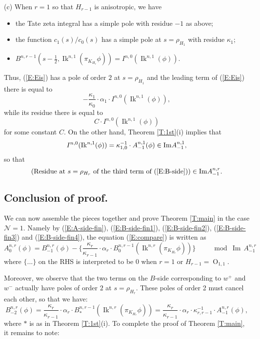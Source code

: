 \documentclass[10pt]{amsart}
\theoremstyle{plain}
\numberwithin{equation}{section}
\begin{document}
\noindent (c) When $r=1$ so that $H_{r-1}$ is anisotropic, we have
\vskip 5pt
\begin{itemize}
\item the Tate zeta integral has a simple pole with residue $-1$  as above;
\item the function $c_1(s)/c_0(s)$ has a simple pole at $s = \rho_{H_1}$ with residue $\kappa_1$;
\item $B^{n, r-1}(s -\frac{1}{2}, {\operatorname{Ik}}^{n,1}(\pi_{K_{H_r}} \phi))= I^{n,0}({\operatorname{Ik}}^{n,1}(\phi))$.
\end{itemize}
Thus, (\ref{E:Eis}) has a pole of order $2$ at $s = \rho_{H_1}$ and the leading term of (\ref{E:Eis}) there is equal to 
\[  - \frac{\kappa_1}{\kappa_0} \cdot \alpha_1 \cdot  I^{n,0}({\operatorname{Ik}}^{n,1}(\phi)), \]
while its residue there is equal to
\[   C \cdot  I^{n,0}({\operatorname{Ik}}^{n,1}(\phi)) \]
for some constant $C$. 
On the other hand, Theorem \ref{T:1st}(i) implies that
 \[ I^{n,0}({\operatorname{Ik}}^{n,1}(\phi)) = \kappa_{1,0}^{-1} \cdot A^{n,1}_{-1}(\phi)  \in {\rm Im} A^{n,1}_{-1}, \]
 so that
    \begin{equation} \label{E:B-side-fin4}
   \left(\text{Residue at $s=\rho_{H_r}$ of the third term of
  (\ref{E:B-side})}\right) \in {\rm Im} A^{n,r}_{-1}. \end{equation}
\vskip 10pt
   
\subsection{\bf Conclusion of proof.}
  We can now assemble the pieces together and prove Theorem
  \ref{T:main} in the case $\mathcal{N} = 1$. Namely by (\ref{E:A-side-fin}),
  (\ref{E:B-side-fin1}),  (\ref{E:B-side-fin2}),  (\ref{E:B-side-fin3}) and (\ref{E:B-side-fin4}), the equation
  (\ref{E:compare}) is written as
  \begin{equation}\label{E:second_term_one_step_before}
 A^{n,r}_0(\phi)  
=   B^{n,r}_{-1}(\phi)  -
 \{  \frac{\kappa_r}{\kappa_{r-1}} \cdot \alpha_r  
  \cdot B_0^{n, r-1}({\operatorname{Ik}}^{n,r}(\pi_{K_{H_r}}\phi)) \}  
\qquad\mod {{\operatorname{Im\,}} A^{n,r}_{-1}}
\end{equation}
where $\{ ...\}$ on the RHS is interpreted to be $0$ when $r=1$ or $H_{r-1} = {\operatorname{O}}_{1,1}$.
\vskip 5pt

  Moreover, we observe that the two terms on the $B$-side corresponding
  to $w^+$ and $w^-$ actually have poles of order $2$ at $s =
  \rho_{H_r}$. These poles of order 2 must cancel each other, so that
  we have:
 \begin{equation}\label{E:first_term_one_step_before}
B^{n,r}_{-2}(\phi)   =\frac{\kappa_r}{\kappa_{r-1}} \cdot
 \alpha_r   \cdot B_{\ast}^{n,r-1}({\operatorname{Ik}}^{n,r}(\pi_{K_{H_r}}\phi))  =
 \frac{\kappa_r}{\kappa_{r-1}} \cdot \alpha_r  \cdot
 \kappa_{r,r-1}^{-1}   \cdot
  A_{-1}^{n,r}(\phi),
\end{equation}
where $\ast$ is as in Theorem \ref{T:1st}(i).
To complete the proof of  Theorem \ref{T:main}, it remains to note:
\vskip 5pt
\end{document}
